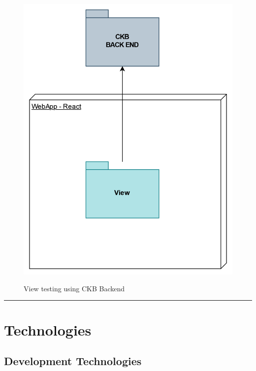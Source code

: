 \documentclass{Configuration_Files/Template}
\begin{document}
\begin{figure}[H]
\centering
\includegraphics[scale = 0.55]{DD_latex/Images/diagrams/ImplementationPlan_Full.png}\\
\caption{View testing using CKB Backend}
\end{figure}

{\color{bluepoli}\rule{\linewidth}{0.1pt}}
\newpage
\section{Technologies}

\subsection{Development Technologies}
\end{document}
